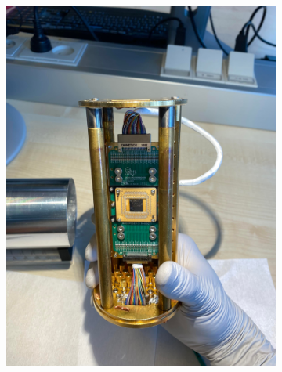 \begin{figure}[h!]
    \centering
    \begin{subfigure}[b]{0.45\textwidth}
         \centering
         \includegraphics[width=\textwidth]{Pic/PuckSydneyboard.jpg}
         \caption{}
         \label{}
     \end{subfigure}
     \hfill
     \begin{subfigure}[b]{0.45\textwidth}
         \centering

\end{subfigure}
\end{figure}
